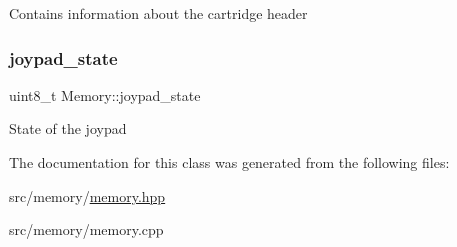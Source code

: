 Contains information about the cartridge header \mbox{\label{classMemory_a2f955513866ad9611418411e921ac120}} 
\subsubsection{\texorpdfstring{joypad\+\_\+state}{joypad\_state}}
{\footnotesize\ttfamily uint8\+\_\+t Memory\+::joypad\+\_\+state}

State of the joypad 

The documentation for this class was generated from the following files\+:\begin{DoxyCompactItemize}
\item 
src/memory/\mbox{\hyperlink{memory_8hpp}{memory.\+hpp}}\item 
src/memory/memory.\+cpp\end{DoxyCompactItemize}
